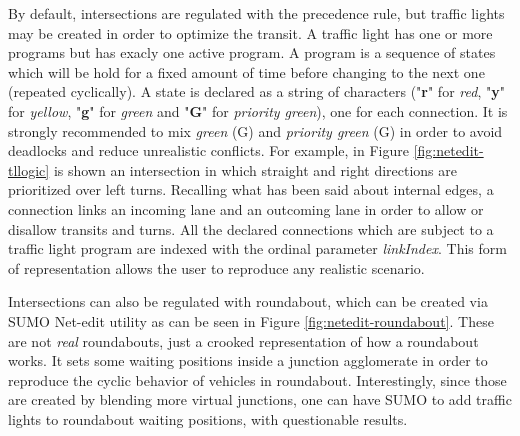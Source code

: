 
By default, intersections are regulated with the precedence rule, but traffic lights may be created in order to optimize the transit. A traffic light has one or more programs but has exacly one active program. A program is a sequence of states which will be hold for a fixed amount of time before changing to the next one (repeated cyclically). A state is declared as a string of characters ("\textbf{r}" for \textit{red}, "\textbf{y}" for \textit{yellow}, "\textbf{g}" for \textit{green} and "\textbf{G}" for \textit{priority green}), one for each connection. It is strongly recommended to mix \textit{green} (G) and \textit{priority green} (G) in order to avoid deadlocks and reduce unrealistic conflicts. For example, in Figure \ref{fig:netedit-tllogic} is shown an intersection in which straight and right directions are prioritized over left turns. Recalling what has been said about internal edges, a connection links an incoming lane and an outcoming lane in order to allow or disallow transits and turns. All the declared connections which are subject to a traffic light program are indexed with the ordinal parameter \textit{linkIndex}. This form of representation allows the user to reproduce any realistic scenario.


Intersections can also be regulated with roundabout, which can be created via SUMO Net-edit utility as can be seen in Figure \ref{fig:netedit-roundabout}. These are not \textit{real} roundabouts, just a crooked representation of how a roundabout works. It sets some waiting positions inside a junction agglomerate in order to reproduce the cyclic behavior of vehicles in roundabout.
Interestingly, since those are created by blending more virtual junctions, one can have SUMO to add traffic lights to roundabout waiting positions, with questionable results.


